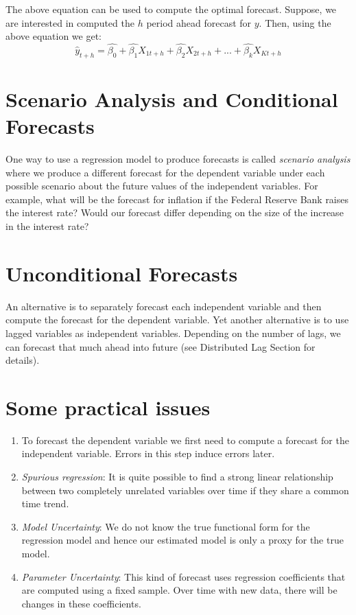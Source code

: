 \documentclass[]{book}
\theoremstyle{definition}
\theoremstyle{definition}
\theoremstyle{definition}
\theoremstyle{remark}
\begin{document}
The above equation can be used to compute the optimal forecast. Suppose, we are interested in computed the \(h\) period ahead forecast for \(y\). Then, using the above equation we get:
\begin{equation}
        \widehat{y}_{t+h} =  \widehat{\beta_0} +\widehat{\beta_1} X_{1t+h} +\widehat{\beta_2} X_{2t+h}+...+ \widehat{\beta_k} X_{Kt+h}
    \end{equation}

\hypertarget{scenario-analysis-and-conditional-forecasts}{%
\section{Scenario Analysis and Conditional Forecasts}\label{scenario-analysis-and-conditional-forecasts}}

One way to use a regression model to produce forecasts is called
\emph{scenario analysis} where we produce a different forecast for the dependent variable under each possible scenario about the future values of the independent variables. For example, what will be the forecast for inflation if the Federal Reserve Bank raises the interest rate? Would our forecast differ depending on the size of the increase in the interest rate?

\hypertarget{unconditional-forecasts}{%
\section{Unconditional Forecasts}\label{unconditional-forecasts}}

An alternative is to separately forecast each independent variable and then compute the forecast for the dependent variable. Yet another alternative is to use lagged variables as independent variables. Depending on the number of lags, we can forecast that much ahead into future (see Distributed Lag Section for details).

\hypertarget{some-practical-issues}{%
\section{Some practical issues}\label{some-practical-issues}}

\begin{enumerate}
\def\labelenumi{\arabic{enumi}.}
\item
  To forecast the dependent variable we first need to compute a forecast for the independent variable. Errors in this step induce errors later.
\item
  \emph{Spurious regression}: It is quite possible to find a strong linear relationship between two completely unrelated variables over time if they share a common time trend.
\item
  \emph{Model Uncertainty}: We do not know the true functional form for the regression model and hence our estimated model is only a proxy for the true model.
\item
  \emph{Parameter Uncertainty}: This kind of forecast uses regression coefficients that are computed using a fixed sample. Over time with new data, there will be changes in these coefficients.
\end{enumerate}
\end{document}
